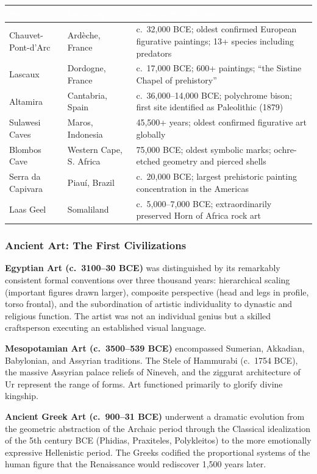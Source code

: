 \documentclass[11pt,letterpaper]{article}
\newcommand{\tableheader}[1]{\textbf{\sffamily\textcolor{white}{#1}}}
\begin{document}
\begin{tabularx}{\textwidth}{L{3.5cm}L{3cm}X}
\toprule
{}
\tableheader{Site} & \tableheader{Location} & \tableheader{Date \& Significance} \\
\midrule
Chauvet-Pont-d'Arc & Ardèche, France & c.~32,000 BCE; oldest confirmed European figurative paintings; 13+ species including predators \\
Lascaux & Dordogne, France & c.~17,000 BCE; 600+ paintings; ``the Sistine Chapel of prehistory'' \\
Altamira & Cantabria, Spain & c.~36,000--14,000 BCE; polychrome bison; first site identified as Paleolithic (1879) \\
Sulawesi Caves & Maros, Indonesia & 45,500+ years; oldest confirmed figurative art globally \\
Blombos Cave & Western Cape, S. Africa & 75,000 BCE; oldest symbolic marks; ochre-etched geometry and pierced shells \\
Serra da Capivara & Piauí, Brazil & c.~20,000 BCE; largest prehistoric painting concentration in the Americas \\
Laas Geel & Somaliland & c.~5,000--7,000 BCE; extraordinarily preserved Horn of Africa rock art \\
\bottomrule
\end{tabularx}

\subsubsection{Ancient Art: The First Civilizations}

\textbf{Egyptian Art (c.~3100--30 BCE)} was distinguished by its remarkably consistent formal conventions over three thousand years: hierarchical scaling (important figures drawn larger), composite perspective (head and legs in profile, torso frontal), and the subordination of artistic individuality to dynastic and religious function. The artist was not an individual genius but a skilled craftsperson executing an established visual language.

\textbf{Mesopotamian Art (c.~3500--539 BCE)} encompassed Sumerian, Akkadian, Babylonian, and Assyrian traditions. The Stele of Hammurabi (c.~1754 BCE), the massive Assyrian palace reliefs of Nineveh, and the ziggurat architecture of Ur represent the range of forms. Art functioned primarily to glorify divine kingship.

\textbf{Ancient Greek Art (c.~900--31 BCE)} underwent a dramatic evolution from the geometric abstraction of the Archaic period through the Classical idealization of the 5th century BCE (Phidias, Praxiteles, Polykleitos) to the more emotionally expressive Hellenistic period. The Greeks codified the proportional systems of the human figure that the Renaissance would rediscover 1,500 years later.
\end{document}
